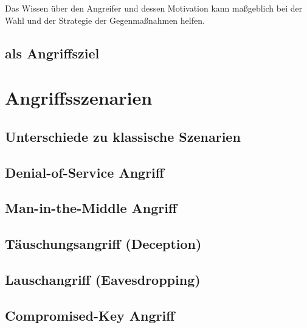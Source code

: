 \documentclass[final,bibliography=totocnumbered]{include/sikseminar}
\begin{document}
Das Wissen über den Angreifer und dessen Motivation kann maßgeblich bei der Wahl und der Strategie der Gegenmaßnahmen helfen. 

\subsection{ als Angriffsziel}\label{subsec:angriffsziel}

\section{Angriffsszenarien}\label{sec:angriffszenarien}
\subsection{Unterschiede zu klassische Szenarien}\label{subsec:klassisch}
\subsection{Denial-of-Service Angriff}\label{subsec:dos}
\subsection{Man-in-the-Middle Angriff}\label{subsec:mitm}
\subsection{T\"auschungsangriff (Deception)}\label{subsec:tauschung} %
\subsection{Lauschangriff (Eavesdropping)}\label{subsec:lauschen} %
\subsection{Compromised-Key Angriff}\label{subsec:key}
\end{document}
